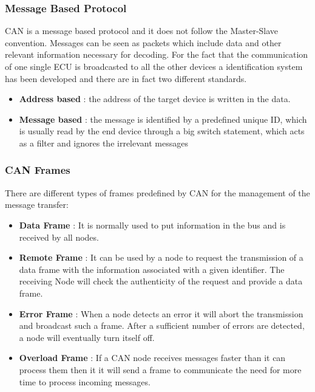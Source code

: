 \documentclass{article}
\begin{document}
\newline
\newline
\subsubsection{Message Based Protocol}
CAN is a message based protocol and it does not follow the Master-Slave convention. Messages can be seen as packets which include data and other relevant information necessary for decoding. For the fact that the communication of one single ECU is broadcasted to all the other devices a identification system has been developed and there are in fact two different standards.
\begin{itemize}
    \item \textbf{Address based} : the address of the target device is written in the data.
    \item \textbf{Message based} : the message is identified by a predefined unique ID, which is usually read by the end device through a big switch statement, which acts as a filter and ignores the irrelevant messages
\end{itemize}

\subsubsection{CAN Frames}
There are different types of frames predefined by CAN for the management of the message transfer:
\begin{itemize}
    \item \textbf{Data Frame} : It is normally used to put information in the bus and is received by all nodes.
    \item \textbf{Remote Frame} : It can be used by a node to request the transmission of a data frame with the information associated with a given identifier. The receiving Node will check the authenticity of the request and provide a data frame.
    \item \textbf{Error Frame} : When a node detects an error it will abort the transmission and broadcast such a frame. After a sufficient number of errors are detected, a node will eventually turn itself off.
    \item \textbf{Overload Frame} : If a CAN node receives messages faster than it can process them then it it will send a frame to communicate the need for more time to process incoming messages.
    
\end{itemize}
\end{document}
